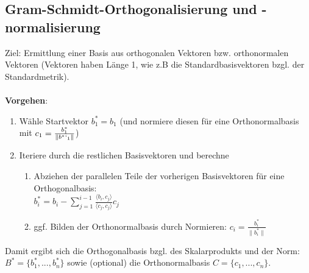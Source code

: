 \documentclass[10pt,a4paper]{article}
\newcommand{\norm}[1]{\lVert#1\rVert}
\begin{document}
	\subsection{Gram-Schmidt-Orthogonalisierung und -normalisierung}
	Ziel: Ermittlung einer Basis aus orthogonalen Vektoren bzw. orthonormalen Vektoren (Vektoren haben Länge 1, wie z.B die Standardbasisvektoren bzgl. der Standardmetrik).\\\\
	\textbf{Vorgehen}:
	\begin{enumerate}
		\item Wähle Startvektor $b^*_1 = b_1$ (und normiere diesen für eine Orthonormalbasis mit $c_1 =  \frac{b^*_1}{\norm{b^*`_1}}$)
		\item Iteriere durch die restlichen Basisvektoren und berechne
		\begin{enumerate}
			\item Abziehen der parallelen Teile der vorherigen Basisvektoren für eine Orthogonalbasis:\\$b^*_i = b_i - \sum_{j = 1}^{i - 1} \frac{\langle b_i, c_j\rangle}{\langle c_j, c_j\rangle}c_j$
			\item ggf. Bilden der Orthonormalbasis durch Normieren: $c_i = \frac{b^*_i}{\norm{b^*_i}}$
		\end{enumerate}
	\end{enumerate}
	Damit ergibt sich die Orthogonalbasis bzgl. des Skalarprodukts und der Norm: $B^* = \{b^*_1, ..., b^*_n\}$ sowie (optional) die Orthonormalbasis $C = \{c_1, ..., c_n\}$.
	
\end{document}
